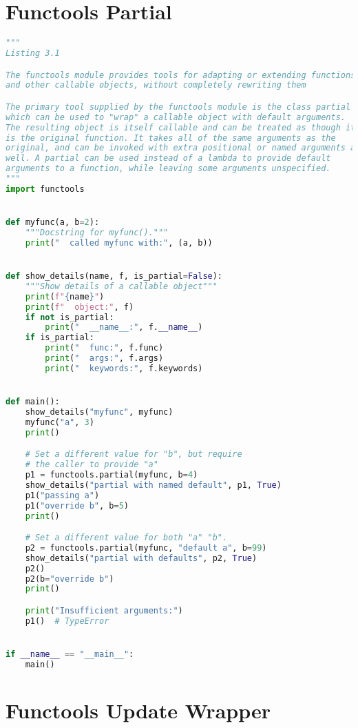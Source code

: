 \documentclass[a4paper,landscape]{report}
\begin{document}
\section{Functools Partial}
\begin{lstlisting}[language=Python]
"""
Listing 3.1

The functools module provides tools for adapting or extending functions
and other callable objects, without completely rewriting them

The primary tool supplied by the functools module is the class partial
which can be used to "wrap" a callable object with default arguments.
The resulting object is itself callable and can be treated as though it
is the original function. It takes all of the same arguments as the
original, and can be invoked with extra positional or named arguments as
well. A partial can be used instead of a lambda to provide default
arguments to a function, while leaving some arguments unspecified.
"""
import functools


def myfunc(a, b=2):
    """Docstring for myfunc()."""
    print("  called myfunc with:", (a, b))


def show_details(name, f, is_partial=False):
    """Show details of a callable object"""
    print(f"{name}")
    print(f"  object:", f)
    if not is_partial:
        print("  __name__:", f.__name__)
    if is_partial:
        print("  func:", f.func)
        print("  args:", f.args)
        print("  keywords:", f.keywords)


def main():
    show_details("myfunc", myfunc)
    myfunc("a", 3)
    print()

    # Set a different value for "b", but require
    # the caller to provide "a"
    p1 = functools.partial(myfunc, b=4)
    show_details("partial with named default", p1, True)
    p1("passing a")
    p1("override b", b=5)
    print()

    # Set a different value for both "a" "b".
    p2 = functools.partial(myfunc, "default a", b=99)
    show_details("partial with defaults", p2, True)
    p2()
    p2(b="override b")
    print()

    print("Insufficient arguments:")
    p1()  # TypeError


if __name__ == "__main__":
    main()

\end{lstlisting}
\section{Functools Update Wrapper}
\begin{lstlisting}[language=Python]

\end{lstlisting}
\end{document}
